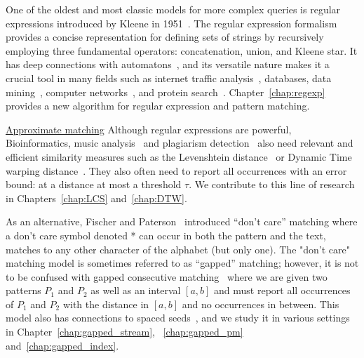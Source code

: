 One of the oldest and most classic models for more complex queries is regular expressions introduced by Kleene in 1951~\cite{RM-704}.
The regular expression formalism provides a concise representation for defining sets of strings by recursively employing three fundamental operators: concatenation, union, and Kleene star.
It has deep connections with automatons~\cite{Thompson_automaton}, and its versatile nature makes it a crucial tool in many fields such as internet traffic analysis~\cite{4221791,4579527}, databases, data mining~\cite{1000341,10.5555/645927.672035,10.1145/375551.375569}, computer networks~\cite{10.1145/1159913.1159952}, and protein search~\cite{10.1145/369133.369220}. Chapter~\ref{chap:regexp} provides a new algorithm for regular expression and pattern matching.

\underline{Approximate matching}
Although regular expressions are powerful, Bioinformatics\cite{Gusfield1997}, music analysis~\cite{mongeau1990comparison} and plagiarism detection~\cite{lukashenko2007computer} also need relevant and efficient similarity measures such as the Levenshtein distance~\cite{levenshtein1966binary} or Dynamic Time warping distance~\cite{sakoe1978dynamic}. They also often need to report all occurrences with an error bound\cite{landau1986efficient,landau1989fast}: at a distance at most a threshold $\tau$.
We contribute to this line of research in Chapters~\ref{chap:LCS} and~\ref{chap:DTW}.

As an alternative, Fischer and Paterson~\cite{fischer1974string} introduced ``don't care'' matching where a don't care symbol denoted * can occur in both the pattern and the text, matches to any other character of the alphabet (but only one).
The "don't care" matching model is sometimes referred to as ``gapped'' matching; however, it is not to be confused with gapped consecutive matching~\cite{bille2022gapped} where we are given two patterns $P_1$ and $P_2$ as well as an interval $[a,b]$ and must report all occurrences of $P_1$ and $P_2$ with the distance in $[a,b]$ and no occurrences in between. This model also has connections to spaced seeds~\cite{burkhardt2003better}, and we study it in various settings in Chapter~\ref{chap:gapped_stream}, ~\ref{chap:gapped_pm} and~\ref{chap:gapped_index}.

